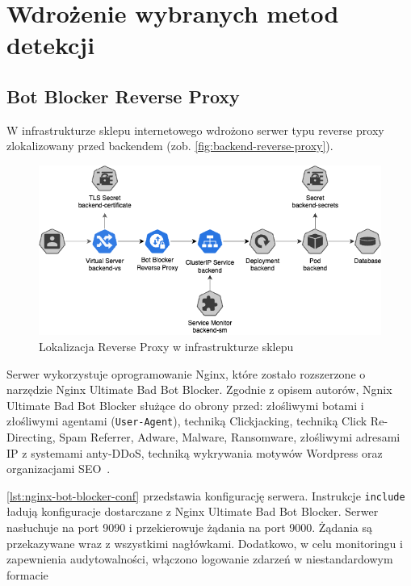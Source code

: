\newpage


\section{Wdrożenie wybranych metod detekcji}\label{sec:wdrozenie-metod-detekcji}

\subsection{Bot Blocker Reverse Proxy}\label{subsec:reverse-proxy-impl}

W infrastrukturze sklepu internetowego wdrożono serwer typu reverse proxy zlokalizowany przed backendem (zob. \autoref{fig:backend-reverse-proxy}).

\begin{figure}[H]
    \centering
    \captionsetup{width=.8\linewidth}
    \includegraphics[width=\textwidth]{img/backend-reverse-proxy}
    \caption{Lokalizacja Reverse Proxy w infrastrukturze sklepu}
    \label{fig:backend-reverse-proxy}
\end{figure}

Serwer wykorzystuje oprogramowanie Nginx, które zostało rozszerzone o narzędzie Nginx Ultimate Bad Bot Blocker.
Zgodnie z opisem autorów, Ngnix Ultimate Bad Bot Blocker służące do obrony przed:
złośliwymi botami i złośliwymi agentami (\texttt{User-Agent}),
techniką Clickjacking, techniką Click Re-Directing,
Spam Referrer, Adware, Malware, Ransomware,
złośliwymi adresami IP z systemami anty-DDoS,
techniką wykrywania motywów Wordpress
oraz organizacjami SEO~\cite{nginx-ultimate-bad-bot-blocker}.

\autoref{lst:nginx-bot-blocker-conf} przedstawia konfigurację serwera.
Instrukcje \texttt{include} ładują konfiguracje dostarczane z Nginx Ultimate Bad Bot Blocker.
Serwer nasłuchuje na port 9090 i przekierowuje żądania na port 9000.
Żądania są przekazywane wraz z wszystkimi nagłówkami.
Dodatkowo, w celu monitoringu i zapewnienia audytowalności, włączono logowanie zdarzeń w niestandardowym formacie

